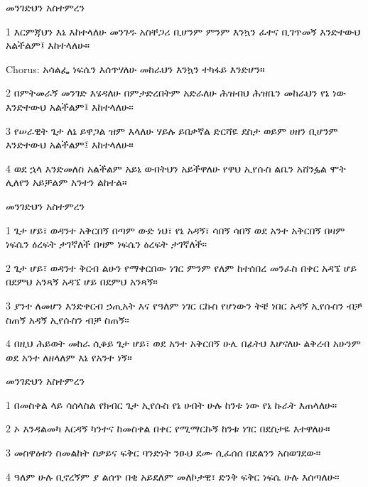 \documentclass[12pt]{article}
\begin{document}
\begin{hymn}{4}{መንገድህን አስተምረን}
\begin{stanza}
1 እርምጃህን እኔ እከተላለሁ
መንገዱ አስቸጋሪ ቢሆንም
ምንም እንኳን ፈተና ቢገጥመኝ
እንድተውህ አልችልም፤ እከተላለሁ።
\end{stanza}
\begin{chorus}
Chorus: አሳልፌ ነፍሴን
እሰጥሃለሁ
መከራህን እንኳን
ተካፋይ እንድሆን።
\end{chorus}
\begin{stanza}
2 በምትመራኝ መንገድ እሄዳለሁ
በምታድረበትም አድራለሁ
ሕዝብህ ሕዝቤን መከራህን የኔ ነው
እንድተውህ አልችልም፤ እከተላለሁ።
\end{stanza}
\begin{stanza}
3 የሠራዊት ጌታ ለኔ ይዋጋል
ዝም እላለሁ ሃይሉ ይበቃኛል
ድርሻዬ ደስታ ወይም ሀዘን ቢሆንም
እንድተውህ አልችልም፤ እከተላለሁ።
\end{stanza}
\begin{stanza}
4 ወደ ኋላ እንድመለስ አልችልም
አይኔ ውበትህን አይችዋለሁ
የዋህ ኢየሱስ ልቤን አሸንፏል
ሞት ሊለየን አይቻልም አንተን ልከተል።
\end{stanza}
\end{hymn}

\begin{hymn}{4}{መንገድህን አስተምረን}
\begin{stanza}
1 ጌታ ሆይ፣ ወዳንተ አቅርበኝ
በጣም ውድ ነህ፣ የኔ አዳኝ፣ ሳበኝ
ሳበኝ ወደ አንተ አቅርበኝ
በዛም ነፍሴን ዕረፍት ታገኛለች
በዛም ነፍሴን ዕረፍት ታገኛለች።
\end{stanza}
\begin{stanza}
2 ጌታ ሆይ፣ ወዳንተ ቅርብ ልሁን
የማቀርበው ነገር ምንም የለም
ከተሰበረ መንፈስ በቀር
አዳኜ ሆይ በደምህ አንጻኝ
አዳኜ ሆይ በደምህ አንጻኝ።
\end{stanza}
\begin{stanza}
3 ያንተ ለመሆን እንድቀርብ
ኃጢአት እና የዓለም ነገር
ርኩስ የሆነውን ትቼ ነበር
አዳኝ ኢየሱስን ብቻ ስጠኝ
አዳኝ ኢየሱስን ብቻ ስጠኝ።
\end{stanza}
\begin{stanza}
4 በዚህ ሕይወት መከራ ሲቆይ
ጌታ ሆይ፣ ወደ አንተ አቅርበኝ
ሁሌ በፊትህ እሆናለሁ
ልቅረብ አሁንም ወደ አንተ
ለዘላለም እኔ የአንተ ነኝ።
\end{stanza}
\end{hymn}

\begin{hymn}{4}{መንገድህን አስተምረን}
\begin{stanza}
1 በመስቀል ላይ ሳሰላስል
የክብር ጌታ ኢየሱስ
የኔ ሀብት ሁሉ ከንቱ ነው
የኔ ኩራት እጠላለሁ።
\end{stanza}
\begin{stanza}
2 ኦ እንዳልመካ እርዳኝ
ካንተና ከመስቀል በቀር
የሚማርኩኝ ከንቱ ነገር
በደስታዬ እተዋለሁ።
\end{stanza}
\begin{stanza}
3 መስዋዕቱን ስመልከት
ስቃይና ፍቅር ባንድነት
ንፁህ ደሙ ሲፈሰሰ
በደልንን አስወገደው።
\end{stanza}
\begin{stanza}
4 ዓለም ሁሉ ቢኖረኝም
ያ ልሰጥ በቂ አይደለም
መለኮታዊ፣ ድንቅ ፍቅር
ነፍሴ ሁሉ እሰጣለሁ።
\end{stanza}

\end{hymn}
\end{document}
